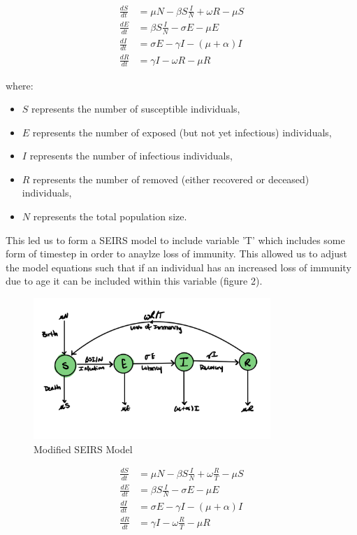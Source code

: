 \documentclass{report}
\begin{document}
\begin{align}
\frac{dS}{dt} &= \mu N - \beta S \frac{I}{N} + \omega R - \mu S \\
\frac{dE}{dt} &= \beta S \frac{I}{N} - \sigma E - \mu E \\
\frac{dI}{dt} &= \sigma E - \gamma I - ( \mu + \alpha )I \\
\frac{dR}{dt} &= \gamma I - \omega R - \mu R
\end{align}

where:
\begin{itemize}
  \item \(S\) represents the number of susceptible individuals,
  \item \(E\) represents the number of exposed (but not yet infectious) individuals,
  \item \(I\) represents the number of infectious individuals,
  \item \(R\) represents the number of removed (either recovered or deceased) individuals,
  \item \(N\) represents the total population size.
\end{itemize}


 This led us to form a SEIRS model to include variable 'T' which includes some form of timestep in order to anaylze loss of immunity. This allowed us to adjust the model equations such that if an individual has an increased loss of immunity due to age it can be included within this variable (figure 2).
 
\begin{figure}[H]
    \centering
    \includegraphics[width=0.8\textwidth]{seirsM.jpeg}
    \caption{Modified SEIRS Model}
    \label{fig:Immunosenscence Model}
\end{figure}
\begin{align}
\frac{dS}{dt} &= \mu N - \beta S \frac{I}{N} + \omega \frac{R}{T} - \mu S \\
\frac{dE}{dt} &= \beta S \frac{I}{N} - \sigma E - \mu E \\
\frac{dI}{dt} &= \sigma E - \gamma I - ( \mu + \alpha )I \\
\frac{dR}{dt} &= \gamma I - \omega \frac{R}{T} - \mu R
\end{align}
\end{document}
